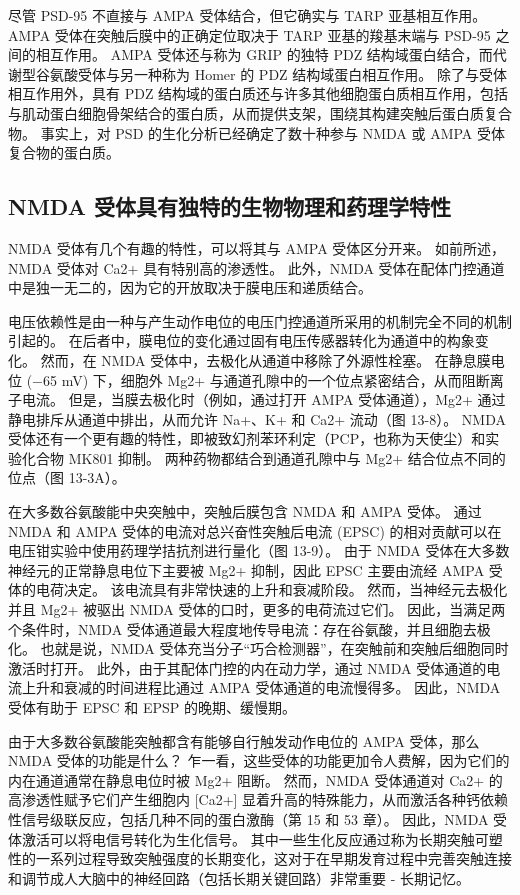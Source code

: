 尽管 PSD-95 不直接与 AMPA 受体结合，但它确实与 TARP 亚基相互作用。 AMPA 受体在突触后膜中的正确定位取决于 TARP 亚基的羧基末端与 PSD-95 之间的相互作用。 AMPA 受体还与称为 GRIP 的独特 PDZ 结构域蛋白结合，而代谢型谷氨酸受体与另一种称为 Homer 的 PDZ 结构域蛋白相互作用。 除了与受体相互作用外，具有 PDZ 结构域的蛋白质还与许多其他细胞蛋白质相互作用，包括与肌动蛋白细胞骨架结合的蛋白质，从而提供支架，围绕其构建突触后蛋白质复合物。 事实上，对 PSD 的生化分析已经确定了数十种参与 NMDA 或 AMPA 受体复合物的蛋白质。

\subsection{NMDA 受体具有独特的生物物理和药理学特性}

NMDA 受体有几个有趣的特性，可以将其与 AMPA 受体区分开来。 如前所述，NMDA 受体对 Ca2+ 具有特别高的渗透性。 此外，NMDA 受体在配体门控通道中是独一无二的，因为它的开放取决于膜电压和递质结合。

电压依赖性是由一种与产生动作电位的电压门控通道所采用的机制完全不同的机制引起的。 在后者中，膜电位的变化通过固有电压传感器转化为通道中的构象变化。 然而，在 NMDA 受体中，去极化从通道中移除了外源性栓塞。 在静息膜电位 (−65 mV) 下，细胞外 Mg2+ 与通道孔隙中的一个位点紧密结合，从而阻断离子电流。 但是，当膜去极化时（例如，通过打开 AMPA 受体通道），Mg2+ 通过静电排斥从通道中排出，从而允许 Na+、K+ 和 Ca2+ 流动（图 13-8）。 NMDA 受体还有一个更有趣的特性，即被致幻剂苯环利定（PCP，也称为天使尘）和实验化合物 MK801 抑制。 两种药物都结合到通道孔隙中与 Mg2+ 结合位点不同的位点（图 13-3A）。

在大多数谷氨酸能中央突触中，突触后膜包含 NMDA 和 AMPA 受体。 通过 NMDA 和 AMPA 受体的电流对总兴奋性突触后电流 (EPSC) 的相对贡献可以在电压钳实验中使用药理学拮抗剂进行量化（图 13-9）。 由于 NMDA 受体在大多数神经元的正常静息电位下主要被 Mg2+ 抑制，因此 EPSC 主要由流经 AMPA 受体的电荷决定。 该电流具有非常快速的上升和衰减阶段。 然而，当神经元去极化并且 Mg2+ 被驱出 NMDA 受体的口时，更多的电荷流过它们。 因此，当满足两个条件时，NMDA 受体通道最大程度地传导电流：存在谷氨酸，并且细胞去极化。 也就是说，NMDA 受体充当分子“巧合检测器”，在突触前和突触后细胞同时激活时打开。 此外，由于其配体门控的内在动力学，通过 NMDA 受体通道的电流上升和衰减的时间进程比通过 AMPA 受体通道的电流慢得多。 因此，NMDA 受体有助于 EPSC 和 EPSP 的晚期、缓慢期。

由于大多数谷氨酸能突触都含有能够自行触发动作电位的 AMPA 受体，那么 NMDA 受体的功能是什么？ 乍一看，这些受体的功能更加令人费解，因为它们的内在通道通常在静息电位时被 Mg2+ 阻断。 然而，NMDA 受体通道对 Ca2+ 的高渗透性赋予它们产生细胞内 [Ca2+] 显着升高的特殊能力，从而激活各种钙依赖性信号级联反应，包括几种不同的蛋白激酶（第 15 和 53 章）。 因此，NMDA 受体激活可以将电信号转化为生化信号。 其中一些生化反应通过称为长期突触可塑性的一系列过程导致突触强度的长期变化，这对于在早期发育过程中完善突触连接和调节成人大脑中的神经回路（包括长期关键回路）非常重要 - 长期记忆。


